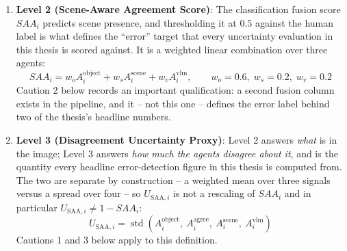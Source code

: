 \documentclass[12pt,a4paper]{report}
\begin{document}
\begin{enumerate}
\paragraph{What this costs at archive scale}: The throughput measured during the corpus run
projects directly. On the same four GPUs, a $53{,}000$-image archive would take approximately
$0.9$ hours for detection, $2.2$ for scene classification, $5.8$ for the vision-language model and
$11.9$ for grounded OCR: about $\mathbf{21}$ hours in total, producing roughly $36$\,MB of signal
output. Inference is not the constraint. The constraint is that running the archive end to end
produces a decision for every image and a measurement of correctness for none of them: there are
$1{,}535$ human labels for $12{,}110$ images and none at all for the further $40{,}890$ a
$53{,}000$-image archive would add. Scaling the compute multiplies the output; it does not
multiply the evidence, and the certified figures above would still rest on the same $249$ labelled
test images.

A fifth signal, \textit{Agreement}, is \emph{derived} rather than measured:
    \begin{equation}
        A_i^{\text{agree}} = 1 - \left|A_i^{\text{object}} - A_i^{\text{vlm}}\right|
        \label{eq:agree}
    \end{equation}
    It quantifies concordance between the spatial and VQA agents specifically. It is not a fifth model, and Caution 1 below explains why its derived status matters.

    \item \textbf{Level 2 (Scene-Aware Agreement Score)}: The classification fusion score $SAA_i$ predicts scene presence, and thresholding it at $0.5$ against the human label is what defines the ``error'' target that every uncertainty evaluation in this thesis is scored against. It is a weighted linear combination over three agents:
    \begin{equation}
        SAA_i = w_o A_i^{\text{object}} + w_s A_i^{\text{scene}} + w_v A_i^{\text{vlm}},
        \qquad w_o = 0.6,\; w_s = 0.2,\; w_v = 0.2
    \end{equation}
    Caution 2 below records an important qualification: a second fusion column exists in the pipeline, and it -- not this one -- defines the error label behind two of the thesis's headline numbers.

    \item \textbf{Level 3 (Disagreement Uncertainty Proxy)}: Level 2 answers \emph{what} is in the image; Level 3 answers \emph{how much the agents disagree about it}, and is the quantity every headline error-detection figure in this thesis is computed from. The two are separate by construction -- a weighted mean over three signals versus a spread over four -- so $U_{\text{SAA},i}$ is not a rescaling of $SAA_i$ and in particular $U_{\text{SAA},i} \ne 1 - SAA_i$:
    \begin{equation}
        U_{\text{SAA}, i} = \operatorname{std}\left(A_i^{\text{object}},\ A_i^{\text{agree}},\ A_i^{\text{scene}},\ A_i^{\text{vlm}}\right)
    \end{equation}
    Cautions 1 and 3 below apply to this definition.


\end{enumerate}
\end{document}
